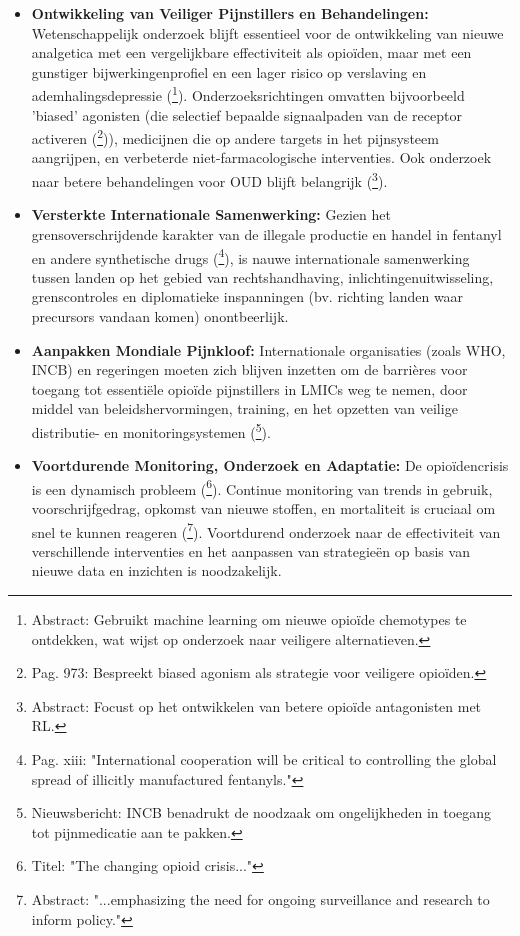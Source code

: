 \documentclass[11pt, a4paper]{report} %
\begin{document}
\begin{itemize}
    \item \textbf{Ontwikkeling van Veiliger Pijnstillers en Behandelingen:} Wetenschappelijk onderzoek blijft essentieel voor de ontwikkeling van nieuwe analgetica met een vergelijkbare effectiviteit als opioïden, maar met een gunstiger bijwerkingenprofiel en een lager risico op verslaving en ademhalingsdepressie (\cite{Feinberg2018MLMolecularDynamicsOpioid}\footnote{Abstract: Gebruikt machine learning om nieuwe opioïde chemotypes te ontdekken, wat wijst op onderzoek naar veiligere alternatieven.}). Onderzoeksrichtingen omvatten bijvoorbeeld 'biased' agonisten (die selectief bepaalde signaalpaden van de receptor activeren (\cite{Shang2020MolecularBasis}\footnote{Pag. 973: Bespreekt biased agonism als strategie voor veiligere opioïden.})), medicijnen die op andere targets in het pijnsysteem aangrijpen, en verbeterde niet-farmacologische interventies. Ook onderzoek naar betere behandelingen voor OUD blijft belangrijk (\cite{Deng2020TowardsBetterOpioidAntagonistsRL}\footnote{Abstract: Focust op het ontwikkelen van betere opioïde antagonisten met RL.}).
    \item \textbf{Versterkte Internationale Samenwerking:} Gezien het grensoverschrijdende karakter van de illegale productie en handel in fentanyl en andere synthetische drugs (\cite{Pardo2019FutureFentanyl}\footnote{Pag. xiii: "International cooperation will be critical to controlling the global spread of illicitly manufactured fentanyls."}), is nauwe internationale samenwerking tussen landen op het gebied van rechtshandhaving, inlichtingenuitwisseling, grenscontroles en diplomatieke inspanningen (bv. richting landen waar precursors vandaan komen) onontbeerlijk.
    \item \textbf{Aanpakken Mondiale Pijnkloof:} Internationale organisaties (zoals WHO, INCB) en regeringen moeten zich blijven inzetten om de barrières voor toegang tot essentiële opioïde pijnstillers in LMICs weg te nemen, door middel van beleidshervormingen, training, en het opzetten van veilige distributie- en monitoringsystemen (\cite{INCB2024Report}\footnote{Nieuwsbericht: INCB benadrukt de noodzaak om ongelijkheden in toegang tot pijnmedicatie aan te pakken.}).
    \item \textbf{Voortdurende Monitoring, Onderzoek en Adaptatie:} De opioïdencrisis is een dynamisch probleem (\cite{Volkow2021ChangingOpioidCrisis}\footnote{Titel: "The changing opioid crisis..."}). Continue monitoring van trends in gebruik, voorschrijfgedrag, opkomst van nieuwe stoffen, en mortaliteit is cruciaal om snel te kunnen reageren (\cite{Schuler2020StateScienceOpioidPolicy}\footnote{Abstract: "...emphasizing the need for ongoing surveillance and research to inform policy."}). Voortdurend onderzoek naar de effectiviteit van verschillende interventies en het aanpassen van strategieën op basis van nieuwe data en inzichten is noodzakelijk.
\end{itemize}
\end{document}
